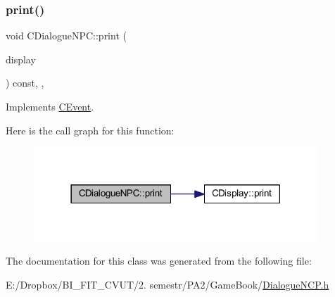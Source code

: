 \subsubsection{\texorpdfstring{print()}{print()}}
{\footnotesize\ttfamily void C\+Dialogue\+N\+P\+C\+::print (\begin{DoxyParamCaption}\item[{const \mbox{\hyperlink{class_c_display}{C\+Display}} \&}]{display }\end{DoxyParamCaption}) const\hspace{0.3cm}{\ttfamily [inline]}, {\ttfamily [override]}, {\ttfamily [virtual]}}



Implements \mbox{\hyperlink{class_c_event_ad6f75aa0babcd74caff9426cecdd86f0}{C\+Event}}.

Here is the call graph for this function\+:\nopagebreak
\begin{figure}[H]
\begin{center}
\leavevmode
\includegraphics[width=302pt]{class_c_dialogue_n_p_c_a1deb79509daa19585916a308c9b42e9c_cgraph}
\end{center}
\end{figure}


The documentation for this class was generated from the following file\+:\begin{DoxyCompactItemize}
\item 
E\+:/\+Dropbox/\+B\+I\+\_\+\+F\+I\+T\+\_\+\+C\+V\+U\+T/2. semestr/\+P\+A2/\+Game\+Book/\mbox{\hyperlink{_dialogue_n_c_p_8h}{Dialogue\+N\+C\+P.\+h}}\end{DoxyCompactItemize}
